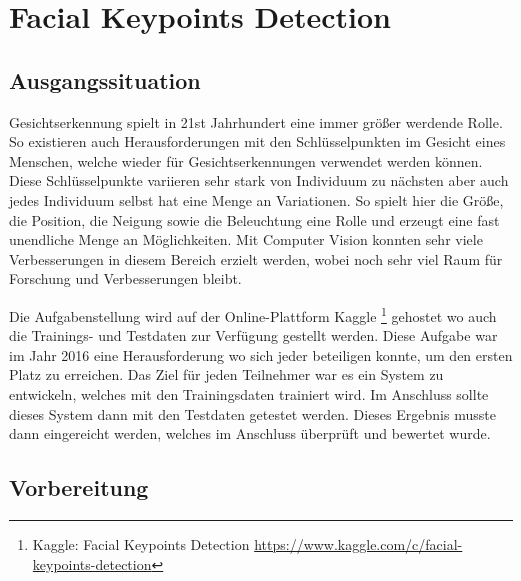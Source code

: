 \chapter{Facial Keypoints Detection}
\label{cha:Facial Keypoints Detection}

\section{Ausgangssituation}

Gesichtserkennung spielt in 21st Jahrhundert eine immer größer werdende Rolle. 
So existieren auch Herausforderungen mit den Schlüsselpunkten im Gesicht eines Menschen, welche wieder für Gesichtserkennungen verwendet werden können. 
Diese Schlüsselpunkte variieren sehr stark von Individuum zu nächsten aber auch jedes Individuum selbst hat eine Menge an Variationen. 
So spielt hier die Größe, die Position, die Neigung sowie die Beleuchtung eine Rolle und erzeugt eine fast unendliche Menge an Möglichkeiten. 
Mit Computer Vision konnten sehr viele Verbesserungen in diesem Bereich erzielt werden, wobei noch sehr viel Raum für Forschung und Verbesserungen bleibt. \newline

\noindent
Die Aufgabenstellung wird auf der Online-Plattform Kaggle \footnote{Kaggle: Facial Keypoints Detection \url{https://www.kaggle.com/c/facial-keypoints-detection}} gehostet wo auch die Trainings- und Testdaten zur Verfügung gestellt werden. 
Diese Aufgabe war im Jahr 2016 eine Herausforderung wo sich jeder beteiligen konnte, um den ersten Platz zu erreichen. 
Das Ziel für jeden Teilnehmer war es ein System zu entwickeln, welches mit den Trainingsdaten trainiert wird.
Im Anschluss sollte dieses System dann mit den Testdaten getestet werden. 
Dieses Ergebnis musste dann eingereicht werden, welches im Anschluss überprüft und bewertet wurde.

\section{Vorbereitung}

